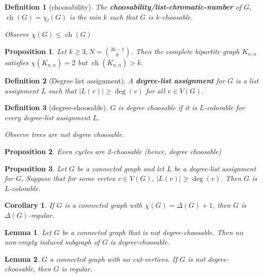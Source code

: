 \documentclass{article}
\newcommand{\size}[1]{|#1|}
\newcommand{\st}{such that }
\DeclareMathOperator*{\ch}{ch}
\newtheorem*{definition}{Definition}
\newtheorem*{proposition}{Proposition}
\newtheorem*{lemma}{Lemma}
\newtheorem*{corollary}{Corollary}
\begin{document}
\begin{definition}[choosability]
    The \textbf{choosability/list-chromatic-number} of $ G $, $ \ch(G) = \chi_l(G)$ is the min $ k $ \st $ G $ is $ k $-choosable.

    Observe $ \chi(G) \leq \ch(G) $
\end{definition}

\begin{proposition}
    Let $ k \geq 3, N = \binom{2k - 1}{k} $. Then the complete bipartite graph $ K_{n,n} $ satisfies $ \chi(K_{n,n}) = 2 $ but
    $ \ch(K_{n,n}) > k$.
\end{proposition}

\begin{definition}[Degree list assignment]
    A \textbf{degree-list assignment} for $ G $ is a list assignment $ L $ \st $ \size{L(v)} \geq \deg(v) $ for all $ v \in V(G) $.
\end{definition}

\begin{definition}[degree-choosable]
    $ G $ is degree choosable if it is $ L $-colorable for every degree-list assignment $ L $.

    Observe trees are not degree choosable.
\end{definition}

\begin{proposition}
    Even cycles are 2-choosable (hence, degree choosable)
\end{proposition}

\begin{proposition}
    Let $ G $ be a connected graph and let $ L $ be a degree-list assignment for $ G $. Suppose that for some vertex $ v \in V(G) $,
    $ \size{L(v)} \geq \deg(v) $. Then $ G $ is $ L $-colorable.
\end{proposition}

\begin{corollary}
    If $ G $ is a connected graph with $ \chi(G) = \Delta(G) + 1 $, then $ G $ is $ \Delta(G) $-regular.
\end{corollary}

\begin{lemma}
    Let $ G $ be a connected graph that is not degree-choosable. Then no non-empty induced subgraph of $ G $ is degree-choosable.
\end{lemma}

\begin{lemma}
    $ G $ a connected graph with no cut-vertices. If $ G $ is not degree-choosable, then $ G $ is regular.
\end{lemma}
\end{document}
